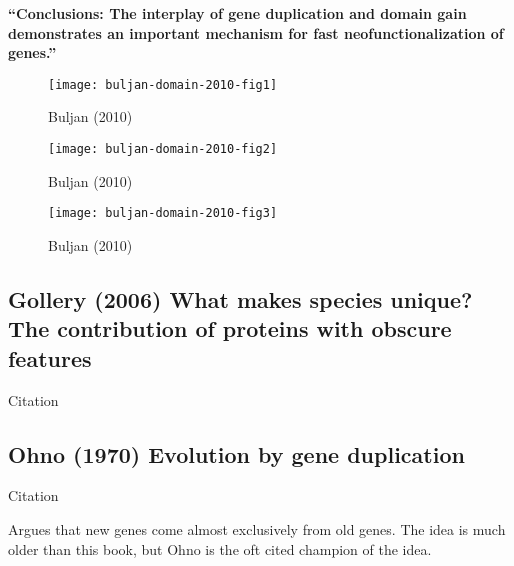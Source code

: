     \textbf{``Conclusions: The interplay of gene duplication and domain gain
        demonstrates an important mechanism for fast neofunctionalization of
        genes.''}

    \begin{figure}[!ht]
        \centering
        \texttt{[image: buljan-domain-2010-fig1]}
        \caption{Buljan (2010)}
    \end{figure}

    \begin{figure}[!ht]
        \centering
        \texttt{[image: buljan-domain-2010-fig2]}
        \caption{Buljan (2010)}
    \end{figure}

    \begin{figure}[!ht]
        \centering
        \texttt{[image: buljan-domain-2010-fig3]}
        \caption{Buljan (2010)}
    \end{figure}
    \FloatBarrier
    
\subsection{Gollery (2006) What makes species unique? The contribution of
proteins with obscure features}

    Citation \cite{gollery_what_2006}

\subsection{Ohno (1970) Evolution by gene duplication}

    Citation \cite{ohno_evolution_1970}

    Argues that new genes come almost exclusively from old genes. The idea
    is much older than this book, but Ohno is the oft cited champion of the
    idea.

